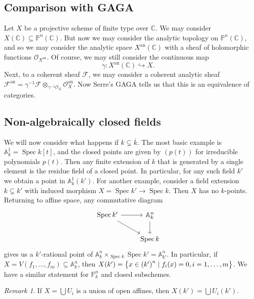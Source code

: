 \documentclass[leqno, openany]{memoir}
\theoremstyle{definition}
\theoremstyle{remark}
\newtheorem{rmk}[thm]{Remark}
\theoremstyle{plain}
\theoremstyle{definition}
\theoremstyle{remark}
\newcommand{\A}{\mathbb{A}}
\newcommand{\C}{\mathbb{C}}
\renewcommand{\P}{\mathbb{P}}
\newcommand{\mc}[1]{\mathcal{#1}}
\newcommand{\mr}[1]{\mathrm{#1}}
\newcommand{\ol}[1]{\overline{#1}}
\DeclareMathOperator{\Spec}{Spec}
\begin{document}
\subsection{Comparison with GAGA}%

Let $X$ be a projective scheme of finite type over $\C$. We may consider $X(\C)
\subseteq \P^n(\C)$. But now we may consider the analytic topology on
$\P^n(\C)$, and so we may consider the analytic space $X^{\mr{an}}(\C)$ with a
sheaf of holomorphic functions $\mc{O}_{X^{\mr{an}}}$. Of course, we may still
consider the continuous map \[ \gamma \colon X^{\mr{an}}(\C) \hookrightarrow X.
\] Next, to a coherent sheaf $\mc{F}$, we may consider a coherent analytic
sheaf $\mc{F}^{\mr{an}} = \gamma^{-1} \mc{F} \otimes_{\gamma^{-1} \mc{O}_X}
\mc{O}_X^{\mr{an}}$. Now Serre's GAGA tells us that this is an equivalence of
categories.

\subsection{Non-algebraically closed fields}%
\label{sub:non_algebraically_closed_fields}

We will now consider what happens if $k \subsetneq \ol{k}$. The most basic
example is $\A^1_k = \Spec k[t]$, and the closed points are given by $(p(t))$
for irreducible polynomials $p(t)$. Then any finite extension of $k$ that is
generated by a single element is the residue field of a closed point. In
particular, for any such field $k'$ we obtain a point in $\A^1_k(k')$. For
another example, consider a field extension $k \subsetneq k'$ with induced
morphism $X = \Spec k' \to \Spec k$. Then $X$ has no $k$-points. Returning to
affine space, any commutative diagram \begin{equation*} \begin{tikzcd} \Spec k'
\ar{r} \ar{dr} & \A^n_k \ar{d} \\ & \Spec k \end{tikzcd} \end{equation*} gives
us a $k'$-rational point of $\A^n_k \times_{\Spec k} \Spec k' = \A^n_{k'}$. In
particular, if $X = V(f_1, \ldots, f_m) \subseteq \A^n_k$, then $X(k') = \qty{x
\in {(k')}^n \mid f_i(x) = 0, i = 1, \ldots, m}$. We have a similar statement
for $\P^n_k$ and closed subschemes.

\begin{rmk} If $X = \bigcup U_i$ is a union of open affines, then $X(k') =
\bigcup U_i(k')$.  \end{rmk}
\end{document}
